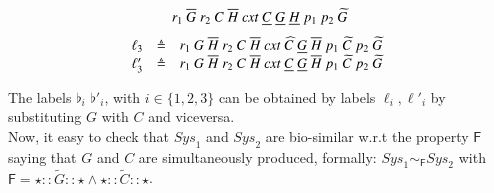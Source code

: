 {\[\begin{array}{lcl@{\hspace{0.3cm}} lcl}
r_1~\overline{G}~r_2~C~\overline{H}~\mathit{cxt}~\underline{C}~\underline{G}~\underline{H}~p_1~p_2~\widetilde{G}
\end{array}
\]
\[
\begin{array}{lcl @{\hspace{0.3cm}}lcl}
\ell_3 & \defeq & 
r_1~G~\overline{H}~r_2~C~\overline{H}~\mathit{cxt}~\widehat{C}~\underline{G}~\overline{H}~p_1~\widetilde{C}~p_2~\widetilde{G}
\\
\ell'_3 & \defeq & r_1~G~\overline{H}~r_2~C~\overline{H}~\mathit{cxt}~\underline{C}~\underline{G}~\overline{H}~p_1~\widetilde{C}~p_2~\widetilde{G}
\end{array}
\]
}

The labels $\flat_i$ $\flat'_i$, with $i \in \{1,2,3\}$ can be obtained by labels $\ell_i,\ell'_i$ by substituting $G$ with $C$ and viceversa.
\\
Now, it easy to check that $\mathit{Sys}_1$ and $\mathit{Sys}_2$ are bio-similar w.r.t the property $\mathsf{F}$ saying that $G$ and $C$ are simultaneously  produced,
formally:
$\mathit{Sys}_1 \sim_{\mathsf{F}} \mathit{Sys}_2$ with $\mathsf{F}= \star :: \widetilde{G} :: \star \wedge  \star :: \widetilde{C} :: \star $.

